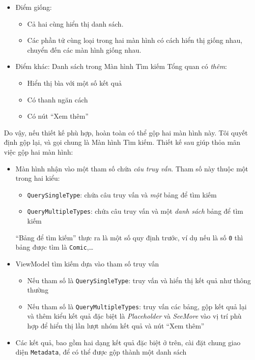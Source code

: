 \documentclass[
]{article}
\providecommand{\tightlist}{%
  \setlength{\itemsep}{0pt}\setlength{\parskip}{0pt}}
\begin{document}
\begin{itemize}
\item
  Điểm giống:

  \begin{itemize}
  \tightlist
  \item
    Cả hai cùng hiển thị danh sách.
  \item
    Các phần tử cùng loại trong hai màn hình có cách hiển thị giống
    nhau, chuyển đến các màn hình giống nhau.
  \end{itemize}
\item
  Điểm khác: Danh sách trong Màn hình Tìm kiếm Tổng quan có \emph{thêm}:

  \begin{itemize}
  \tightlist
  \item
    Hiển thị bìa với một số kết quả
  \item
    Có thanh ngăn cách
  \item
    Có nút ``Xem thêm''
  \end{itemize}
\end{itemize}

Do vậy, nếu thiết kế phù hợp, hoàn toàn có thể gộp hai màn hình này. Tôi
quyết định gộp lại, và gọi chung là Màn hình Tìm kiếm. Thiết kế sau giúp
thỏa mãn việc gộp hai màn hình:

\begin{itemize}
\item
  Màn hình nhận vào một tham số chứa \emph{câu truy vấn}. Tham số này
  thuộc một trong hai kiểu:

  \begin{itemize}
  \tightlist
  \item
    \texttt{QuerySingleType}: chứa câu truy vấn và \emph{một} bảng để
    tìm kiếm
  \item
    \texttt{QueryMultipleTypes}: chứa câu truy vấn và một \emph{danh
    sách} bảng để tìm kiếm
  \end{itemize}

  ``Bảng để tìm kiếm'' thực ra là một số quy định trước, ví dụ nếu là số
  \texttt{0} thì bảng được tìm là \texttt{Comic},\ldots{}
\item
  ViewModel tìm kiếm dựa vào tham số truy vấn

  \begin{itemize}
  \tightlist
  \item
    Nếu tham số là \texttt{QuerySingleType}: truy vấn và hiển thị kết
    quả như thông thường
  \item
    Nếu tham số là \texttt{QueryMultipleTypes}: truy vấn các bảng, gộp
    kết quả lại và thêm kiểu kết quả đặc biệt là \emph{Placeholder} và
    \emph{SeeMore} vào vị trí phù hợp để hiển thị lần lượt nhóm kết quả
    và nút ``Xem thêm''
  \end{itemize}
\item
  Các kết quả, bao gồm hai dạng kết quả đặc biệt ở trên, cài đặt chung
  giao diện \texttt{Metadata}, để có thể được gộp thành một danh sách
\end{itemize}
\end{document}
